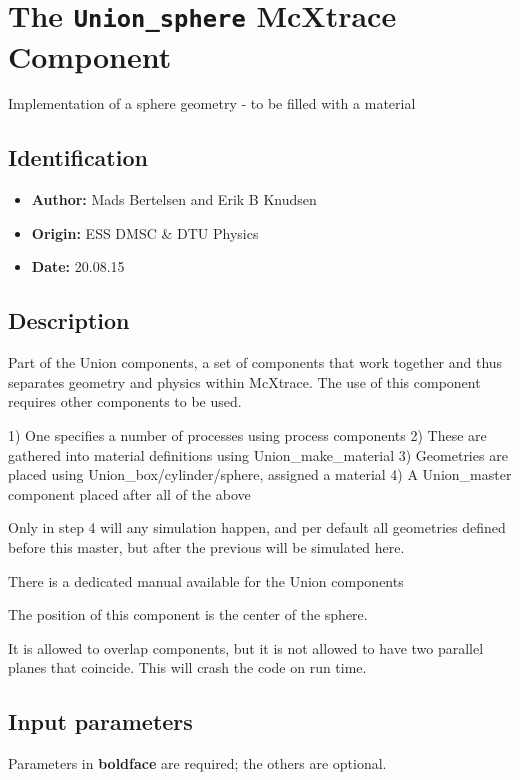 \section{The \texttt{Union\_sphere} McXtrace Component}
Implementation of a sphere geometry - to be filled with a material

\subsection*{Identification}
\begin{itemize}
  \item \textbf{Author:} Mads Bertelsen and Erik B Knudsen
  \item \textbf{Origin:} ESS DMSC \& DTU Physics
  \item \textbf{Date:} 20.08.15
\end{itemize}

\subsection*{Description}
Part of the Union components, a set of components that work together and thus separates geometry and physics within McXtrace. The use of this component requires other components to be used.

1) One specifies a number of processes using process components 2) These are gathered into material definitions using Union\_make\_material 3) Geometries are placed using Union\_box/cylinder/sphere, assigned a material 4) A Union\_master component placed after all of the above

Only in step 4 will any simulation happen, and per default all geometries defined before this master, but after the previous will be simulated here.

There is a dedicated manual available for the Union components

The position of this component is the center of the sphere.

It is allowed to overlap components, but it is not allowed to have two parallel planes that coincide. This will crash the code on run time.

\subsection*{Input parameters}
Parameters in \textbf{boldface} are required; the others are optional.

